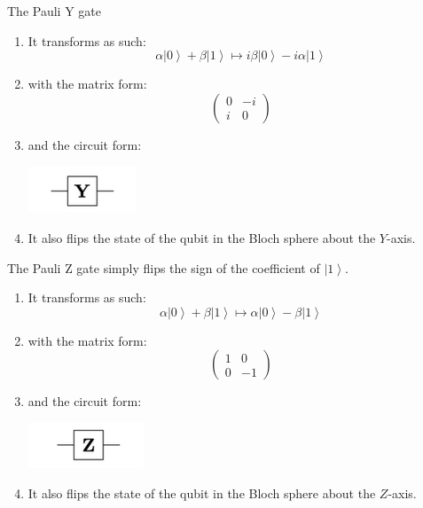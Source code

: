 \documentclass{article}
\newcommand{\ket}[1]{\ensuremath{\left|#1\right\rangle}}
\begin{document}
    \begin{definition}[Pauli Y]
      The Pauli Y gate 
      \begin{enumerate} 
        \item It transforms as such: 
          \begin{equation} 
            \alpha \ket{0} + \beta \ket{1} \mapsto  i \beta \ket{0} - i \alpha \ket{1}
          \end{equation}
        \item with the matrix form: 
          \begin{equation} 
            \begin{pmatrix} 0 & -i \\ i & 0 \end{pmatrix}
          \end{equation}
        \item and the circuit form: 
          \begin{center}
            \includegraphics[scale=0.5]{img/Pauli_Y_gate.png}
          \end{center}
        \item It also flips the state of the qubit in the Bloch sphere about the $Y$-axis. 
      \end{enumerate}
    \end{definition}

    \begin{definition}[Pauli Z]
      The Pauli Z gate simply flips the sign of the coefficient of $\ket{1}$. 
      \begin{enumerate} 
        \item It transforms as such: 
          \begin{equation} 
            \alpha \ket{0} + \beta \ket{1} \mapsto \alpha \ket{0} - \beta \ket{1}
          \end{equation}
        \item with the matrix form: 
          \begin{equation} 
            \begin{pmatrix} 1 & 0 \\ 0 & -1 \end{pmatrix}
          \end{equation}
        \item and the circuit form: 
          \begin{center}
            \includegraphics[scale=0.5]{img/Pauli_Z_gate.png}
          \end{center}
        \item It also flips the state of the qubit in the Bloch sphere about the $Z$-axis. 
      \end{enumerate}
    \end{definition}
\end{document}
